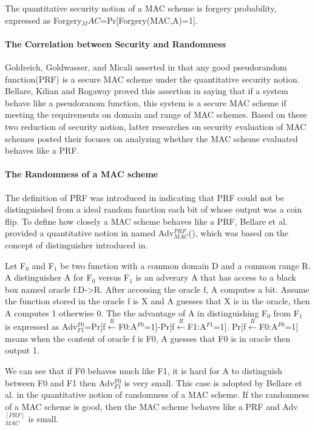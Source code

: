 \documentclass{article}
\begin{document}
The quantitative security notion of a MAC scheme is forgery probability, expressed as Forgery$_MAC$=Pr[Forgery(MAC,A)=1].
\paragraph{The Correlation between Security and Randomness}
Goldreich, Goldwasser, and Micali asserted in \cite{prf} that any good pseudorandom function(PRF) is a secure MAC scheme under the quantitative security notion. Bellare, Kilian and Rogaway proved this assertion in \cite{cbc1994} saying that if a system behave like a pseudoranom function, this system is a secure MAC scheme if meeting the requirements on domain and range of MAC schemes. Based on these two reduction of security notion, latter researches on security evaluation of MAC schemes posted their focuses on analyzing whether the MAC scheme evaluated behaves like a PRF.
\paragraph{The Randomness of a MAC scheme}
The definition of PRF was introduced in \cite{prf} indicating that PRF could not be distinguished from a ideal random function each bit of whose output was a coin flip. To define how closely a MAC scheme behaves like a PRF, Bellare et al. provided a quantitative notion in \cite{cbc1994} named Adv$^{PRF}_{MAC}$(), which was based on the concept of distinguisher introduced in\cite{prf}. 

Let F$_0$ and F$_1$ be two function with a common domain D and a common range R. A distinguisher A for F$_0$ versus F$_1$ is an adverary A that has access to a black box named oracle f:D->R. After accessing the oracle f, A computes a bit. Assume the function stored in the oracle f is X and A guesses that X is in the oracle, then A computes 1 otherwise 0. The the advantage of A in distinguishing F$_0$ from F$_1$ is expressed as Adv$^{F0}_{F1}$=Pr[f$\stackrel{R}{\longleftarrow}$F0:A$^{F0}$=1]-Pr[f$\stackrel{R}{\longleftarrow}$F1:A$^{F1}$=1]. Pr[f$\stackrel{R}{\longleftarrow}$F0:A$^{F0}$=1] means when the content of oracle f is F0, A guesses that F0 is in oracle then output 1.

We can see that if F0 behaves much like F1, it is hard for A to distinguish between F0 and F1 then Adv$^{F0}_{F1}$ is very small. This case is adopted by Bellare et al. in the quantitative notion of randomness of a MAC scheme. If the randomness of a MAC scheme is good, then the MAC scheme behaves like a PRF and Adv$^{[PRF]}_{MAC}$ is small. 
\end{document}
